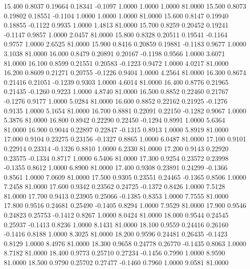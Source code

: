  15.400   0.8037   0.19664   0.18341  -0.1097   1.0000   1.0000   1.0000  81.0000
  15.500   0.8073   0.19802   0.18551  -0.1104   1.0000   1.0000   1.0000  81.0000
  15.600   0.8147   0.19940   0.18855  -0.1122   0.9935   1.0000   1.4813  81.0000
  15.700   0.8259   0.20452   0.19241  -0.1147   0.9857   1.0000   2.0457  81.0000
  15.800   0.8328   0.20511   0.19541  -0.1164   0.9757   1.0000   2.6525  81.0000
  15.900   0.8416   0.20859   0.19881  -0.1183   0.9677   1.0000   3.1038  81.0000
  16.000   0.8479   0.20891   0.20167  -0.1198   0.9566   1.0000   3.6071  81.0000
  16.100   0.8599   0.21551   0.20583  -0.1223   0.9472   1.0000   4.0217  81.0000
  16.200   0.8609   0.21271   0.20755  -0.1226   0.9404   1.0000   4.2564  81.0000
  16.300   0.8674   0.21416   0.21051  -0.1239   0.9303   1.0000   4.6014  81.0000
  16.400   0.8776   0.21965   0.21435  -0.1260   0.9223   1.0000   4.8740  81.0000
  16.500   0.8852   0.22460   0.21767  -0.1276   0.9177   1.0000   5.0284  81.0000
  16.600   0.8852   0.22162   0.21925  -0.1276   0.9135   1.0000   5.1654  81.0000
  16.700   0.8881   0.22091   0.22150  -0.1282   0.9067   1.0000   5.3876  81.0000
  16.800   0.8942   0.22290   0.22450  -0.1294   0.8991   1.0000   5.6364  81.0000
  16.900   0.9044   0.22897   0.22847  -0.1315   0.8913   1.0000   5.8919  81.0000
  17.000   0.9104   0.23275   0.23156  -0.1327   0.8865   1.0000   6.0487  81.0000
  17.100   0.9101   0.22914   0.23314  -0.1326   0.8810   1.0000   6.2330  81.0000
  17.200   0.9143   0.22920   0.23575  -0.1334   0.8717   1.0000   6.5406  81.0000
  17.300   0.9254   0.23572   0.23998  -0.1355   0.8612   1.0000   6.8900  81.0000
  17.400   0.9308   0.23891   0.24299  -0.1366   0.8561   1.0000   7.0609  81.0000
  17.500   0.9305   0.23551   0.24465  -0.1365   0.8506   1.0000   7.2458  81.0000
  17.600   0.9342   0.23562   0.24725  -0.1372   0.8426   1.0000   7.5128  81.0000
  17.700   0.9413   0.23905   0.25066  -0.1385   0.8353   1.0000   7.7555  81.0000
  17.800   0.9516   0.24681   0.25490  -0.1405   0.8294   1.0000   7.9529  81.0000
  17.900   0.9546   0.24823   0.25753  -0.1412   0.8267   1.0000   8.0424  81.0000
  18.000   0.9544   0.24545   0.25937  -0.1413   0.8236   1.0000   8.1431  81.0000
  18.100   0.9559   0.24416   0.26160  -0.1416   0.8188   1.0000   8.3025  81.0000
  18.200   0.9596   0.24481   0.26435  -0.1423   0.8129   1.0000   8.4976  81.0000
  18.300   0.9658   0.24778   0.26770  -0.1435   0.8063   1.0000   8.7182  81.0000
  18.400   0.9773   0.25710   0.27234  -0.1456   0.7990   1.0000   8.9590  81.0000
  18.500   0.9790   0.25702   0.27477  -0.1460   0.7960   1.0000   9.0581  81.0000
